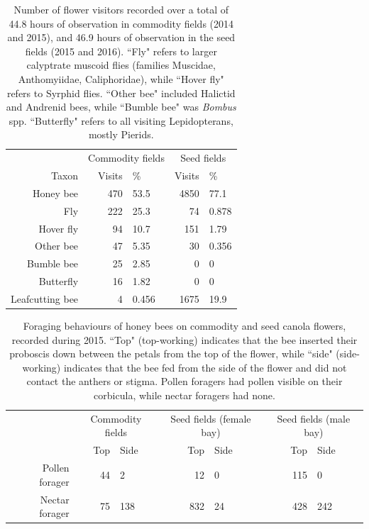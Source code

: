 \documentclass[12pt]{article} %
\begin{document}
\begin{table}[h]
  \caption{Number of flower visitors recorded over a total of 44.8 hours of observation in commodity fields (2014 and 2015), and 46.9 hours of observation in the seed fields (2015 and 2016). ``Fly" refers to larger calyptrate muscoid flies (families Muscidae, Anthomyiidae, Caliphoridae), while ``Hover fly" refers to Syrphid flies. ``Other bee" included Halictid and Andrenid bees, while ``Bumble bee" was \textit{Bombus} spp. ``Butterfly" refers to all visiting Lepidopterans, mostly Pierids.}
  \centering
    \begin{tabular}{r|r|l|r|l}
     & \multicolumn{2}{c|}{Commodity fields} & \multicolumn{2}{c}{Seed fields} \\ \cline{2-5}
    Taxon & Visits & \% & Visits & \% \\ \hline
    Honey bee & 470 & 53.5 & 4850 & 77.1 \\
    Fly & 222 & 25.3 & 74 & 0.878 \\
    Hover fly & 94 & 10.7 & 151 & 1.79 \\
    Other bee & 47 & 5.35 & 30 & 0.356 \\
    Bumble bee & 25 & 2.85 & 0 & 0 \\
    Butterfly & 16 & 1.82 & 0 & 0 \\
    Leafcutting bee & 4 & 0.456 & 1675 & 19.9 \\
    \end{tabular}
\end{table}

\begin{table}[h]
\caption[Foraging behaviours of honey bees on commodity and seed canola flowers]{Foraging behaviours of honey bees on commodity and seed canola flowers, recorded during 2015. ``Top" (top-working) indicates that the bee inserted their proboscis down between the petals from the top of the flower, while ``side" (side-working) indicates that the bee fed from the side of the flower and did not contact the anthers or stigma. Pollen foragers had pollen visible on their corbicula, while nectar foragers had none.}
\begin{tabular}{r|r|l|r|l|r|l}
               & \multicolumn{2}{c|}{Commodity fields} & \multicolumn{2}{c|}{Seed fields (female bay)} & \multicolumn{2}{c}{Seed fields (male bay)} \\ \cline{2-7}
               & Top & Side & Top & Side & Top & Side           \\ \hline
Pollen forager & 44 & 2 & 12 & 0 & 115 & 0 \\
Nectar forager & 75 & 138 & 832 & 24 & 428 & 242 \\
\end{tabular}
\end{table}
\end{document}
